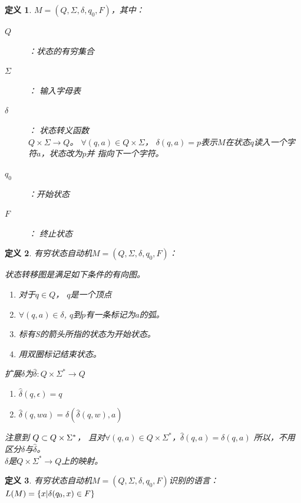 \documentclass{ctexart}
\newtheorem{definition}{定义}[section]
\DeclarePairedDelimiter{\set}{\{}{\}}
\begin{document}
\begin{definition}
    $M = (Q, \Sigma, \delta, q_0, F)$，其中：

    \begin{description}
        \item[$Q$]：状态的有穷集合
        \item[$\Sigma$]： 输入字母表
        \item[$\delta$]： 状态转义函数\\
            $Q\times\Sigma \to Q$。 $\forall (q,a) \in Q\times\Sigma$，
            $\delta(q,a) = p$表示$M$在状态$q$读入一个字符$a$，状态改为$p$并
            指向下一个字符。
        \item[$q_0$]：开始状态
        \item[$F$]： 终止状态 
    \end{description}
\end{definition}
\begin{definition}
    有穷状态自动机$M = (Q, \Sigma, \delta, q_0, F)$：

    状态转移图是满足如下条件的有向图。
    \begin{enumerate}
        \item 对于$q \in Q$， $q$是一个顶点
        \item $\forall (q,a) \in \delta$, $q$到$p$有一条标记为$a$的弧。
        \item 标有S的箭头所指的状态为开始状态。
        \item 用双圈标记结束状态。
    \end{enumerate}

    扩展$\delta$为$\hat{\delta}: Q \times \Sigma^* \to Q$
    \begin{enumerate}
        \item $\hat{\delta}(q,\epsilon) = q$
        \item $\hat{\delta}(q, wa) = \delta(\hat{\delta}(q,w), a)$
    \end{enumerate}
    注意到 $Q \time \Sigma \subset Q \times \Sigma^*$，
    且对$\forall (q, a) \in Q \times \Sigma^*$，$\hat{\delta}(q, a) = \delta(q, a)$
    所以，不用区分$\delta$与$\hat{\delta}$。 \\
    $\delta$是$Q \times \Sigma^* \to Q$上的映射。
\end{definition}

\begin{definition}
    有穷状态自动机$M = (Q, \Sigma, \delta, q_0, F)$识别的语言：
    $L(M) = \set*{x | \delta(q_0, x) \in F}$
\end{definition}
\end{document}
